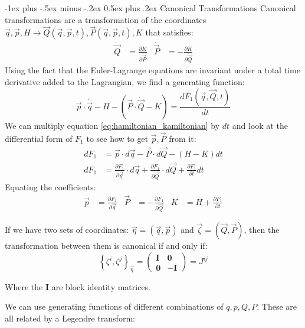 \documentclass[10pt,landscape]{article}
\makeatletter
\renewcommand{\section}{\@startsection{section}{1}{0mm}%
                                {-1ex plus -.5ex minus -.2ex}%
                                {0.5ex plus .2ex}%
                                {\normalfont\large\bfseries}}
\makeatother
\begin{document}
\begin{multicols}{3}
\section{Canonical Transformations}
Canonical transformations are a transformation of the coordinates $\vec{q}, \vec{p}, H \rightarrow \vec{Q}(\vec{q}, \vec{p}, t), \vec{P}(\vec{q}, \vec{p}, t), K$ that satisfies:
\begin{align}
	\dot{\vec Q}&=\frac{\partial K}{\partial \dot{\vec{P}}} & \dot{\vec P}&=-\frac{\partial K}{\partial \dot{\vec Q}}
\end{align}
Using the fact that the Euler-Lagrange equations are invariant under a total time derivative added to the Lagrangian, we find a generating function:
\begin{equation}
	\vec{p}\cdot\dot{\vec q}-H-(\vec{P}\cdot\dot{\vec Q}-K) = \frac{dF_1(\vec{q}, \vec{Q}, t)}{dt}
\label{eq:hamiltonian_kamiltonian}
\end{equation}
We can multiply equation \ref{eq:hamiltonian_kamiltonian} by $dt$ and look at the differential form of $F_1$ to see how to get $\vec{p}, \vec{P}$ from it:
\begin{align}
	dF_1 &= \vec{p}\cdot d\vec{q} - \vec{P}\cdot d\vec{Q} -(H-K)dt \\
	dF_1 &= \frac{\partial F_1}{\partial \vec{q}}\cdot d\vec{q} + \frac{\partial F_1}{\partial \vec{Q}}\cdot d\vec{Q} + \frac{\partial F_1}{\partial t}dt
\end{align}
Equating the coefficients:
\begin{align}
	\vec{p} &= \frac{\partial F_1}{\partial \vec{q}} & 
	\vec{P} &= -\frac{\partial F_1}{\partial \vec{Q}} &
	K &= H + \frac{\partial F_1}{\partial t}
\end{align}

If we have two sets of coordinates: $\vec\eta = (\vec q, \vec p)$ and $\vec\zeta = (\vec Q, \vec P)$, then the transformation between them is canonical if and only if:
\begin{equation}
	\left\{\zeta^i, \zeta^j\right\}_{\vec \eta} = 
	\begin{pmatrix}
		\mathbf{I} & \mathbf{0} \\
		\mathbf{0} & -\mathbf{I} 
	\end{pmatrix} = J^{ij}
\end{equation}

Where the $\mathbf{I}$ are block identity matrices.

We can use generating functions of different combinations of $q, p, Q, P$. These are all related by a Legendre transform:


\end{multicols}
\end{document}
